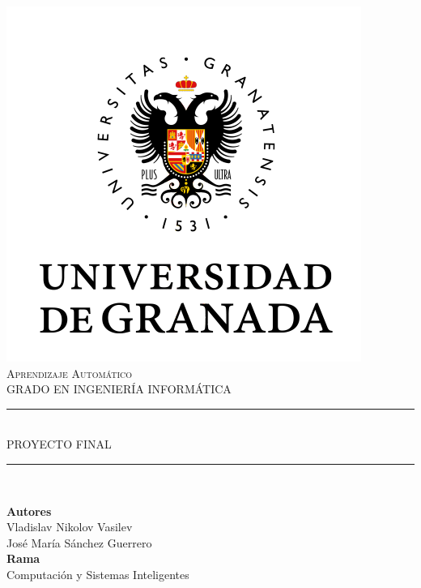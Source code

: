 \documentclass[11pt,a4paper]{article}
\newcommand{\asignatura}{Aprendizaje Automático}
\newcommand{\autor}{Vladislav Nikolov Vasilev}
\begin{document}

\begin{titlepage}

\begin{minipage}{\textwidth}

\centering

\includegraphics[scale=0.5]{img/ugr.png}\\

\textsc{\Large \asignatura{}\\[0.2cm]}
\textsc{GRADO EN INGENIERÍA INFORMÁTICA}\\[1cm]

\noindent\rule[-1ex]{\textwidth}{1pt}\\[1.5ex]
\textsc{{\Huge PROYECTO FINAL\\[0.5ex]}}
\noindent\rule[-1ex]{\textwidth}{2pt}\\[3.5ex]

\end{minipage}

\vspace{1cm}

\begin{minipage}{\textwidth}

\centering

\textbf{Autores}\\ {\autor{}}\\{José María Sánchez Guerrero}\\[2ex]
\textbf{Rama}\\ {Computación y Sistemas Inteligentes}\\[2ex]
\vspace{0.3cm}


\end{minipage}
\end{titlepage}
\end{document}
